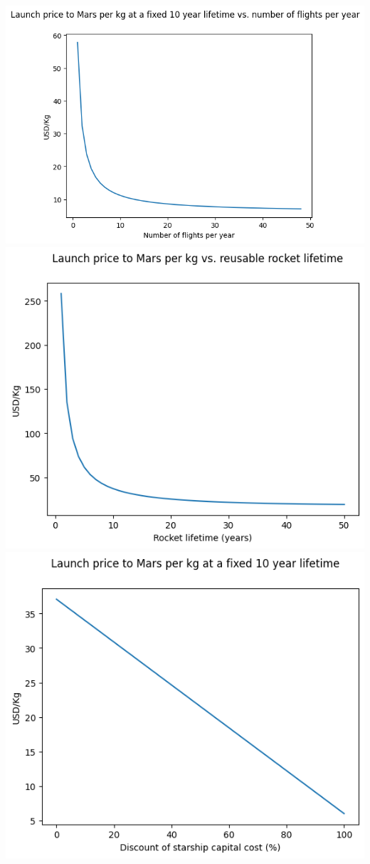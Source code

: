 \documentclass[10pt]{article}
\begin{document}
\includegraphics{fig_numflights.png}
\includegraphics{fig_reuse.png}
\includegraphics{fig_discflights.png}
\end{document}
